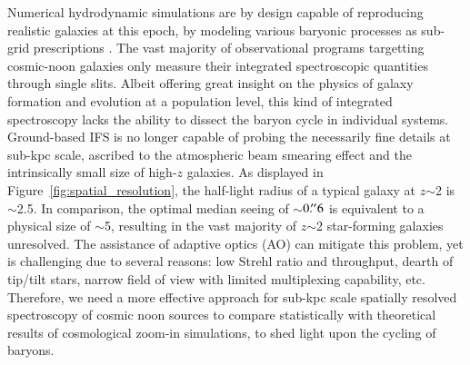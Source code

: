 Numerical hydrodynamic simulations are by design capable of reproducing realistic galaxies at this epoch, by
modeling various baryonic processes as sub-grid prescriptions
\citep{Dave:2017gd,FIRESimulations:2017wj,Pillepich:2019uz}. The vast majority of observational programs
targetting cosmic-noon galaxies only measure their integrated spectroscopic quantities through single slits.
Albeit offering great insight on the physics of galaxy formation and evolution at a population level, this kind
of integrated spectroscopy lacks the ability to dissect the baryon cycle in individual systems.
Ground-based IFS is no longer capable of probing the necessarily fine details at sub-kpc scale, ascribed to the
atmospheric beam smearing effect and the intrinsically small size of high-$z$ galaxies.  As displayed in
Figure~\ref{fig:spatial_resolution}, the half-light radius of a typical \Lstar galaxy at $z$$\sim$2 is
$\sim$2.5\kpc. In comparison, the optimal median seeing of $\sim$$0\mbox{$.\!^{\prime\prime}$}6$ is equivalent to a physical size of
$\sim$5\kpc, resulting in the vast majority of $z$$\sim$2 star-forming galaxies unresolved.  The assistance of
adaptive optics (AO) can mitigate this problem, yet is challenging due to several reasons: low Strehl ratio and
throughput, dearth of tip/tilt stars, narrow field of view with limited multiplexing capability, etc.  Therefore,
we need a more effective approach for sub-kpc scale spatially resolved spectroscopy of cosmic noon sources to
compare statistically with theoretical results of cosmological zoom-in simulations, to shed light upon the
cycling of baryons.

